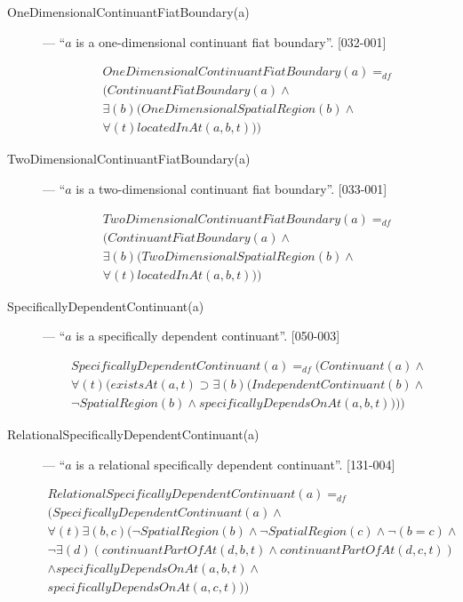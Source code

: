\documentclass{article}
\newcommand{\DF}{\ensuremath{=_{df}}}
\begin{document}
\begin{description}
\item[OneDimensionalContinuantFiatBoundary(a)] --- ``$a$ is a one-dimensional continuant fiat boundary''. [032-001]

\begin{equation}
\begin{split}
OneDimensionalContinuantFiatBoundary(a) \DF \\
(ContinuantFiatBoundary(a) \wedge \\
{\exists}(b)(OneDimensionalSpatialRegion(b) \wedge \\
{\forall}(t)locatedInAt(a, b, t)))
\end{split}
\end{equation}

\item[TwoDimensionalContinuantFiatBoundary(a)] --- ``$a$ is a two-dimensional continuant fiat boundary''. [033-001]

\begin{equation}
\begin{split}
TwoDimensionalContinuantFiatBoundary(a) \DF \\
(ContinuantFiatBoundary(a) \wedge \\
{\exists}(b)(TwoDimensionalSpatialRegion(b) \wedge \\
{\forall}(t)locatedInAt(a, b, t)))
\end{split}
\end{equation}

\item[SpecificallyDependentContinuant(a)] --- ``$a$ is a specifically dependent continuant''. [050-003]

\begin{equation}
\begin{split}
SpecificallyDependentContinuant(a) \DF (Continuant(a) \wedge \\
{\forall}(t)(existsAt(a, t) \supset {\exists}(b)(IndependentContinuant(b) \wedge \\
{\neg}SpatialRegion(b) \wedge specificallyDependsOnAt(a, b, t))))
\end{split}
\end{equation}

\item[RelationalSpecificallyDependentContinuant(a)] --- ``$a$ is a relational specifically dependent continuant''. [131-004]

\begin{equation}
\begin{split}
RelationalSpecificallyDependentContinuant(a) \DF \\
(SpecificallyDependentContinuant(a) \wedge \\
{\forall}(t){\exists}(b, c)({\neg}SpatialRegion(b) \wedge {\neg}SpatialRegion(c) \wedge {\neg}(b = c) \wedge \\
{\neg}{\exists}(d)(continuantPartOfAt(d, b, t) \wedge continuantPartOfAt(d, c, t)) \\
\wedge specificallyDependsOnAt(a, b, t) \wedge \\
specificallyDependsOnAt(a, c, t)))
\end{split}
\end{equation}


\end{description}
\end{document}

